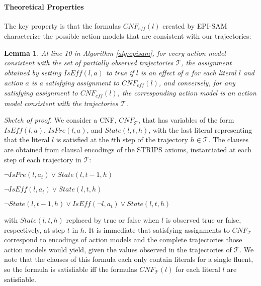 \documentclass[letterpaper]{article} %
\newtheorem{lemma}{Lemma}
\newcommand{\eff}{\textit{eff}}
\newcommand{\iseff}{\textit{IsEff}}
\newcommand{\ispre}{\textit{IsPre}}
\begin{document}
\paragraph{Theoretical Properties}
The key property is that the formulas $CNF_{\eff}(l)$ created by EPI-SAM characterize the possible action models that are consistent with our trajectories:
\begin{lemma}\label{lem:cnf-char}
At line 10 in Algorithm \ref{alg:episam}, for every action model consistent with the set of partially observed trajectories $\mathcal{T}$, the assignment obtained by setting $\iseff(l,a)$ to true if $l$ is an effect of $a$ for each literal $l$ and action $a$ is a satisfying assignment to $CNF_{\eff}(l)$, and conversely, for any satisfying assignment to $CNF_{\eff}(l)$, the corresponding action model is an action model consistent with the trajectories $\mathcal{T}$.
\end{lemma}
\noindent
{\em Sketch of proof.}
We consider a CNF, $CNF_{\mathcal{T}}$, that has variables of the form $\iseff(l,a)$, $\ispre(l,a)$, and $State(l,t,h)$, with the last literal representing that the literal $l$ is satisfied at the $t$th step of the trajectory $h\in\mathcal{T}$. The clauses are obtained from clausal encodings of the STRIPS axioms, instantiated at each step of each trajectory in $\mathcal{T}$:
\begin{compactenum}
\item $\neg \ispre(l,a_t)\vee State(l,t-1,h)$
\item $\neg \iseff(l,a_t)\vee State(l,t,h)$
\item $\neg State(l,t-1,h)\vee \iseff(\neg l,a_t)\vee State(l,t,h)$
\end{compactenum}
with $State(l,t,h)$ replaced by true or false when $l$ is observed true or false, respectively, at step $t$ in $h$. It is immediate that satisfying assignments to $CNF_{\mathcal{T}}$ correspond to encodings of action models and the complete trajectories those action models would yield, given the values observed in the trajectories of $\mathcal{T}$. We note that the clauses of this formula each only contain literals for a single fluent, so the formula is satisfiable iff the formulas $CNF_{\mathcal{T}}(l)$ for each literal $l$ are satisfiable.
\end{document}
